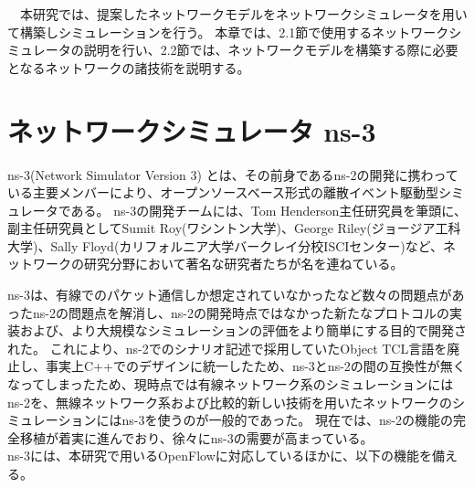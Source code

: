 \begin{comment}
QoE（Quality of Experience）とは，ユーザの満足レベルを定量的に示す指標である．この指標は，ネットワーク自体ではなくその上で提供されるIPTV等のアプリケーションサービスの体感品質のことである．たとえば，IPTVサービスの場合映像・音声の品質，チャンネルの切替え・早送り巻戻しなどのスムーズさ，その他使い勝手全般がQoEとなる．
QoS同様，QoEは評価項目を可能な限り数値指標として記述される．QoEは，ユーザ自身があるサービスについて評価を行い，その評価を数値として可視化したものがQoEとなる．QoSはネットワーク性能を，QoEはユーザーの体感品質をそれぞれ対象とする．つまり，QoS は通信事業者やサービス提供者から見たサービス品質の尺度であり，QoE はユーザーから見たサービス品質の尺度となる\cite{QoE}．
\end{comment}


　本研究では、提案したネットワークモデルをネットワークシミュレータを用いて構築しシミュレーションを行う。
本章では、2.1節で使用するネットワークシミュレータの説明を行い、2.2節では、ネットワークモデルを構築する際に必要となるネットワークの諸技術を説明する。

\section{ネットワークシミュレータ ns-3}

ns-3(Network Simulator Version 3)\cite{ns3} \cite{ns3text} とは、その前身であるns-2の開発に携わっている主要メンバーにより、オープンソースベース形式の離散イベント駆動型シミュレータである。
ns-3の開発チームには、Tom Henderson主任研究員を筆頭に、副主任研究員としてSumit Roy(ワシントン大学)、George Riley(ジョージア工科大学)、Sally Floyd(カリフォルニア大学バークレイ分校ISCIセンター)など、ネットワークの研究分野において著名な研究者たちが名を連ねている。

ns-3は、有線でのパケット通信しか想定されていなかったなど数々の問題点があったns-2の問題点を解消し、ns-2の開発時点ではなかった新たなプロトコルの実装および、より大規模なシミュレーションの評価をより簡単にする目的で開発された。
これにより、ns-2でのシナリオ記述で採用していたObject TCL言語を廃止し、事実上C++でのデザインに統一したため、ns-3とns-2の間の互換性が無くなってしまったため、現時点では有線ネットワーク系のシミュレーションにはns-2を、無線ネットワーク系および比較的新しい技術を用いたネットワークのシミュレーションにはns-3を使うのが一般的であった。
現在では、ns-2の機能の完全移植が着実に進んでおり、徐々にns-3の需要が高まっている。 \\

ns-3には、本研究で用いるOpenFlowに対応しているほかに、以下の機能を備える。

